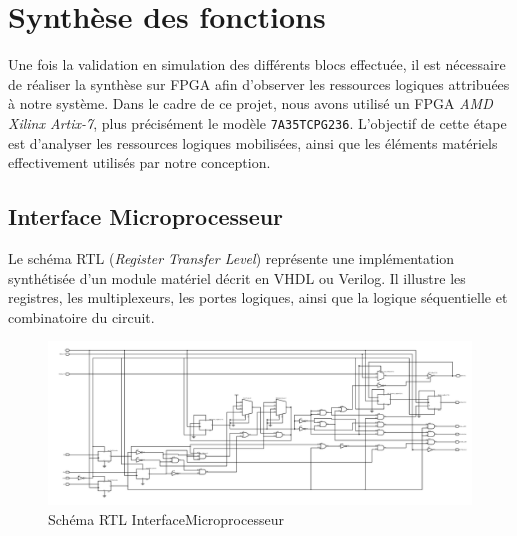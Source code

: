 \section{Synthèse des fonctions}

Une fois la validation en simulation des différents blocs effectuée, il est nécessaire de réaliser la synthèse sur FPGA afin d’observer les ressources logiques attribuées à notre système. 
Dans le cadre de ce projet, nous avons utilisé un FPGA \textit{AMD Xilinx Artix-7}, plus précisément le modèle \texttt{7A35TCPG236}. 
L’objectif de cette étape est d’analyser les ressources logiques mobilisées, ainsi que les éléments matériels effectivement utilisés par notre conception.
\newline

\subsection{Interface Microprocesseur}

Le schéma RTL (\textit{Register Transfer Level}) représente une implémentation 
synthétisée d’un module matériel décrit en VHDL ou Verilog. 
Il illustre les registres, les multiplexeurs, les portes logiques, 
ainsi que la logique séquentielle et combinatoire du circuit.


\begin{figure}[H]
    \centering
    \includegraphics[width=0.9\linewidth]{images/Synthe/RTL_Shematic.png}
    \caption{Schéma RTL InterfaceMicroprocesseur}
    \label{fig:placeholder}
\end{figure}

